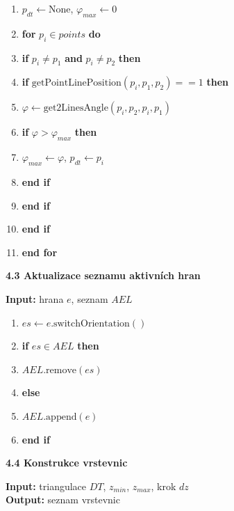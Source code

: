 \documentclass[12pt]{article}
\begin{document}
\begin{enumerate}
    \item $p_{dt} \leftarrow \text{None}$, $\varphi_{max} \leftarrow 0$
    \item \textbf{for} $p_i \in points$ \textbf{do}
    \item \quad \textbf{if} $p_i \neq p_1$ \textbf{and} $p_i \neq p_2$ \textbf{then}
    \item \quad \quad \textbf{if} $\text{getPointLinePosition}(p_i, p_1, p_2) == 1$ \textbf{then}
    \item \quad \quad \quad $\varphi \leftarrow \text{get2LinesAngle}(p_i, p_2, p_i, p_1)$
    \item \quad \quad \quad \textbf{if} $\varphi > \varphi_{max}$ \textbf{then}
    \item \quad \quad \quad \quad $\varphi_{max} \leftarrow \varphi$, $p_{dt} \leftarrow p_i$
    \item \quad \quad \quad \textbf{end if}
    \item \quad \quad \textbf{end if}
    \item \quad \textbf{end if}
    \item \textbf{end for}
\end{enumerate}

\textbf{4.3 Aktualizace seznamu aktivních hran}

\textbf{Input:} hrana $e$, seznam $AEL$

\begin{enumerate}
    \item $es \leftarrow e.\text{switchOrientation}()$
    \item \textbf{if} $es \in AEL$ \textbf{then}
    \item \quad $AEL.\text{remove}(es)$
    \item \textbf{else}
    \item \quad $AEL.\text{append}(e)$
    \item \textbf{end if}
\end{enumerate}

\newpage
\textbf{4.4 Konstrukce vrstevnic}

\textbf{Input:} triangulace $DT$, $z_{min}$, $z_{max}$, krok $dz$ \\ \textbf{Output:} seznam vrstevnic
\end{document}
